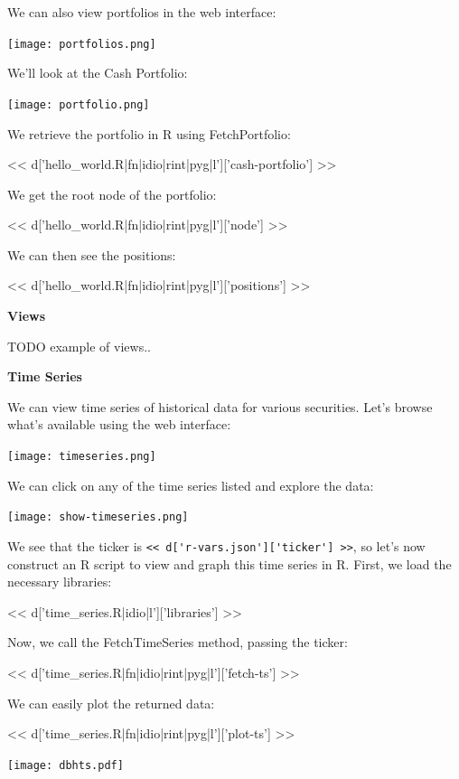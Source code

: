 \documentclass[custom, plainsections]{sciposter}
\begin{document}
\begin{multicols*}{2}
We can also view portfolios in the web interface:

\vspace{0.5cm}
\texttt{[image: portfolios.png]}
\vspace{0.5cm}

We'll look at the Cash Portfolio:

\vspace{0.5cm}
\texttt{[image: portfolio.png]}
\vspace{0.5cm}

We retrieve the portfolio in R using FetchPortfolio:

<< d['hello_world.R|fn|idio|rint|pyg|l']['cash-portfolio'] >>

We get the root node of the portfolio:

<< d['hello_world.R|fn|idio|rint|pyg|l']['node'] >>

We can then see the positions:

<< d['hello_world.R|fn|idio|rint|pyg|l']['positions'] >>

\textbf{Views}

TODO example of views..

\textbf{Time Series}

We can view time series of historical data for various securities. Let's browse what's available using the web interface:

\vspace{0.5cm}
\texttt{[image: timeseries.png]}
\vspace{0.5cm}

We can click on any of the time series listed and explore the data:

\vspace{0.5cm}
\texttt{[image: show-timeseries.png]}
\vspace{0.5cm}

We see that the ticker is \verb|<< d['r-vars.json']['ticker'] >>|, so let's now construct an R script to view and graph this time series in R. First, we load the necessary libraries:

<< d['time_series.R|idio|l']['libraries'] >>

Now, we call the FetchTimeSeries method, passing the ticker:

<< d['time_series.R|fn|idio|rint|pyg|l']['fetch-ts'] >>

We can easily plot the returned data:

<< d['time_series.R|fn|idio|rint|pyg|l']['plot-ts'] >>

\texttt{[image: dbhts.pdf]}


\end{multicols*}
\end{document}
